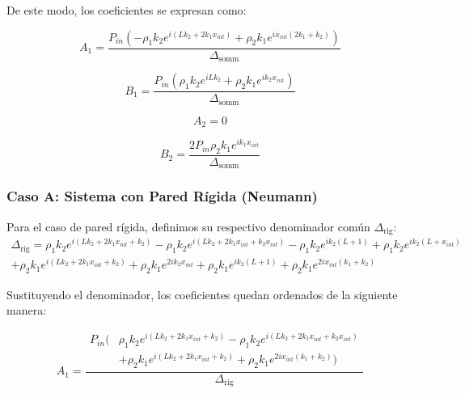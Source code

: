\documentclass[11pt,letterpaper]{article}
\begin{document}
De este modo, los coeficientes se expresan como:

\begin{equation}
    A_1 = \frac{P_{in} \left(- \rho_{1} k_{2} e^{i \left(L k_{2} + 2 k_{1} x_{int}\right)} + \rho_{2} k_{1} e^{i x_{int} \left(2 k_{1} + k_{2}\right)}\right)}{\Delta_{\text{somm}}}
\end{equation}

\begin{equation}
    B_1 = \frac{P_{in} \left(\rho_{1} k_{2} e^{i L k_{2}} + \rho_{2} k_{1} e^{i k_{2} x_{int}}\right)}{\Delta_{\text{somm}}}
\end{equation}

\begin{equation}
    A_2 = 0
\end{equation}

\begin{equation}
    B_2 = \frac{2 P_{in} \rho_{2} k_{1} e^{i k_{1} x_{int}}}{\Delta_{\text{somm}}}
\end{equation}

\subsubsection{Caso A: Sistema con Pared Rígida (Neumann)}

Para el caso de pared rígida, definimos su respectivo denominador común $\Delta_{\text{rig}}$:
\begin{multline}
    \Delta_{\text{rig}} = \rho_{1} k_{2} e^{i \left(L k_{2} + 2 k_{1} x_{int} + k_{2}\right)} - \rho_{1} k_{2} e^{i \left(L k_{2} + 2 k_{1} x_{int} + k_{2} x_{int}\right)} - \rho_{1} k_{2} e^{i k_{2} \left(L + 1\right)} + \rho_{1} k_{2} e^{i k_{2} \left(L + x_{int}\right)} \\
    + \rho_{2} k_{1} e^{i \left(L k_{2} + 2 k_{1} x_{int} + k_{2}\right)} + \rho_{2} k_{1} e^{2 i k_{2} x_{int}} + \rho_{2} k_{1} e^{i k_{2} \left(L + 1\right)} + \rho_{2} k_{1} e^{2 i x_{int} \left(k_{1} + k_{2}\right)}
\end{multline}

Sustituyendo el denominador, los coeficientes quedan ordenados de la siguiente manera:

\begin{equation}
    A_1 = \frac{
        \begin{aligned}
            P_{in} \big( & \rho_{1} k_{2} e^{i \left(L k_{2} + 2 k_{1} x_{int} + k_{2}\right)} - \rho_{1} k_{2} e^{i \left(L k_{2} + 2 k_{1} x_{int} + k_{2} x_{int}\right)} \\
            & + \rho_{2} k_{1} e^{i \left(L k_{2} + 2 k_{1} x_{int} + k_{2}\right)} + \rho_{2} k_{1} e^{2 i x_{int} \left(k_{1} + k_{2}\right)} \big)
        \end{aligned}
    }{
        \Delta_{\text{rig}}
    }
\end{equation}
\end{document}
